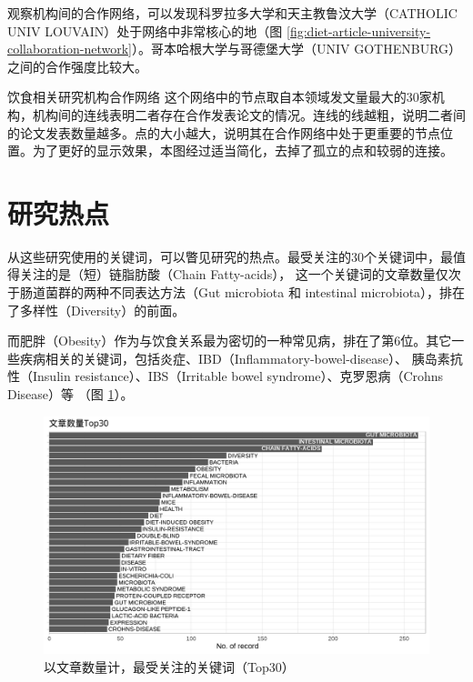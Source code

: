 \documentclass[]{ctexbook}
\begin{document}
观察机构间的合作网络，可以发现科罗拉多大学和天主教鲁汶大学（CATHOLIC UNIV LOUVAIN）处于网络中非常核心的地（图 \ref{fig:diet-article-university-collaboration-network}）。哥本哈根大学与哥德堡大学（UNIV GOTHENBURG）之间的合作强度比较大。

\hypertarget{htmlwidget-798f4f84e2f066126930}{}

\label{fig:diet-article-university-collaboration-network}饮食相关研究机构合作网络
这个网络中的节点取自本领域发文量最大的30家机构，机构间的连线表明二者存在合作发表论文的情况。连线的线越粗，说明二者间的论文发表数量越多。点的大小越大，说明其在合作网络中处于更重要的节点位置。为了更好的显示效果，本图经过适当简化，去掉了孤立的点和较弱的连接。

\hypertarget{ux7814ux7a76ux70edux70b9}{%
\section{研究热点}\label{ux7814ux7a76ux70edux70b9}}

从这些研究使用的关键词，可以瞥见研究的热点。最受关注的30个关键词中，最值得关注的是（短）链脂肪酸（Chain Fatty-acids），
这一个关键词的文章数量仅次于肠道菌群的两种不同表达方法（Gut microbiota 和 intestinal microbiota），排在了多样性（Diversity）的前面。

而肥胖（Obesity）作为与饮食关系最为密切的一种常见病，排在了第6位。其它一些疾病相关的关键词，包括炎症、IBD（Inflammatory-bowel-disease）、
胰岛素抗性（Insulin resistance）、IBS（Irritable bowel syndrome）、克罗恩病（Crohns Disease）等
（图 \ref{fig:diet-id-top30}）。

\begin{figure}
\includegraphics[width=1\linewidth]{plots/diet-id-top30-1} \caption{以文章数量计，最受关注的关键词（Top30）}\label{fig:diet-id-top30}
\end{figure}
\end{document}
